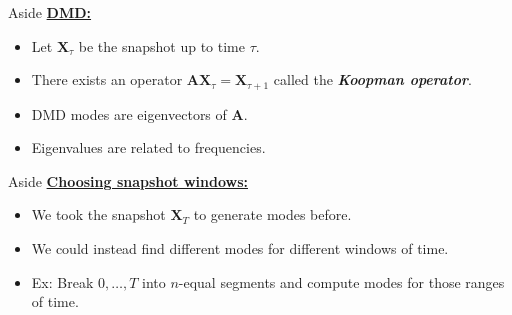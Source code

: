 \documentclass[aspectratio=169]{beamer}
\newcommand\boldgreen[1]{\textcolor{lighter_csu_green}{\emph{\textbf{#1}}}}
\begin{document}

\begin{frame}{Aside}
\vfill
\pause
        \textbf{\underline{DMD:}}
        \begin{itemize}
\pause
            \item Let $\boldsymbol{X}_\tau$ be the snapshot up to time $\tau$.
\pause
            \item There exists an operator $\boldsymbol{A} \boldsymbol{X}_\tau =  \boldsymbol{X}_{\tau+1}$ called the \boldgreen{Koopman operator}.
\pause
            \item DMD modes are eigenvectors of $\boldsymbol{A}$.
\pause
            \item Eigenvalues are related to frequencies.
        \end{itemize}
\vfill
\end{frame}



\begin{frame}{Aside}
\vfill
\pause
    \textbf{\underline{Choosing snapshot windows:}}
        \begin{itemize}
        \pause
        \item We took the snapshot $\boldsymbol{X}_T$ to generate modes before.
        \pause
        \item We could instead find different modes for different windows of time.
        \pause
        \item Ex: Break $0,\dots,T$ into $n$-equal segments and compute modes for those ranges of time.
\end{itemize}
\vfill
\end{frame}

\end{document}
